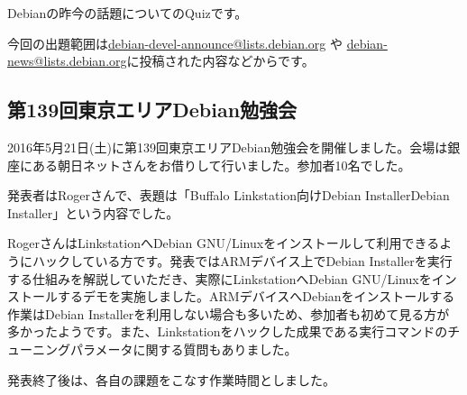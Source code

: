 \documentclass[mingoth,a4paper]{jsarticle}
\begin{document}
%
%


Debianの昨今の話題についてのQuizです。

今回の出題範囲は\url{debian-devel-announce@lists.debian.org} や \url{debian-news@lists.debian.org}に投稿された内容などからです。

\begin{multicols}{2}

\end{multicols}



\subsection{第139回東京エリアDebian勉強会}

2016年5月21日(土)に第139回東京エリアDebian勉強会を開催しました。会場は銀座にある朝日ネットさんをお借りして行いました。参加者10名でした。

発表者はRogerさんで、表題は「Buffalo Linkstation向けDebian InstallerDebian Installer」という内容でした。

RogerさんはLinkstationへDebian GNU/Linuxをインストールして利用できるようにハックしている方です。発表ではARMデバイス上でDebian Installerを実行する仕組みを解説していただき、実際にLinkstationへDebian GNU/Linuxをインストールするデモを実施しました。ARMデバイスへDebianをインストールする作業はDebian Installerを利用しない場合も多いため、参加者も初めて見る方が多かったようです。また、Linkstationをハックした成果である実行コマンドのチューニングパラメータに関する質問もありました。

発表終了後は、各自の課題をこなす作業時間としました。


\end{document}
